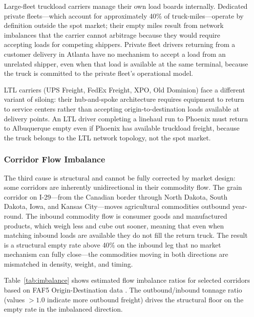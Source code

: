 Large-fleet truckload carriers manage their own load boards internally. Dedicated private fleets---which account for approximately 40\% of truck-miles---operate by definition outside the spot market; their empty miles result from network imbalances that the carrier cannot arbitrage because they would require accepting loads for competing shippers. Private fleet drivers returning from a customer delivery in Atlanta have no mechanism to accept a load from an unrelated shipper, even when that load is available at the same terminal, because the truck is committed to the private fleet's operational model.

LTL carriers (UPS Freight, FedEx Freight, XPO, Old Dominion) face a different variant of siloing: their hub-and-spoke architecture requires equipment to return to service centers rather than accepting origin-to-destination loads available at delivery points. An LTL driver completing a linehaul run to Phoenix must return to Albuquerque empty even if Phoenix has available truckload freight, because the truck belongs to the LTL network topology, not the spot market.

\subsubsection{Corridor Flow Imbalance}

The third cause is structural and cannot be fully corrected by market design: some corridors are inherently unidirectional in their commodity flow. The grain corridor on I-29---from the Canadian border through North Dakota, South Dakota, Iowa, and Kansas City---moves agricultural commodities outbound year-round. The inbound commodity flow is consumer goods and manufactured products, which weigh less and cube out sooner, meaning that even when matching inbound loads are available they do not fill the return truck. The result is a structural empty rate above 40\% on the inbound leg that no market mechanism can fully close---the commodities moving in both directions are mismatched in density, weight, and timing.

Table~\ref{tab:imbalance} shows estimated flow imbalance ratios for selected corridors based on FAF5 Origin-Destination data \citep{FAF5_2023}. The outbound/inbound tonnage ratio (values $> 1.0$ indicate more outbound freight) drives the structural floor on the empty rate in the imbalanced direction.

